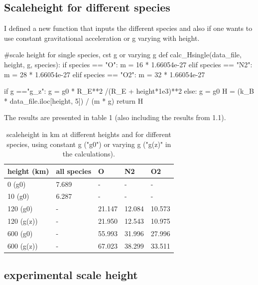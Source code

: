 \documentclass[a4paper, 12pt]{article}
\begin{document}
\subsection{Scaleheight for different species}
I defined a new function that inputs the different species and also if one wants to use constant gravitational acceleration or g varying with height. 


\begin{python}
#scale height for single species, cst g or varying g
def calc_Hsingle(data_file, height, g, species):
    if species == "O":
        m = 16 * 1.66054e-27
    elif species == "N2":
        m = 28 * 1.66054e-27
    elif species == "O2":
        m = 32 * 1.66054e-27
    
    if g =="g_z":
        g = g0 * R_E**2 /(R_E + height*1e3)**2
    else:
        g = g0
    H = (k_B * data_file.iloc[height, 5]) / (m * g)
    return H
\end{python}

The results are presented in table 1 (also including the results from 1.1).
\begin{table}[H]
	\centering
	\caption{scaleheight in km at different heights and for different species, using constant g ("g0") or varying g ("g(z)" in the calculations).}
	\begin{tabular}{lllll}
	height (km) &all species & O & N2 & O2 \\ \hline
	0 (g0) & 7.689 & - & -& - \\ 
	10 (g0)& 6.287& - & - & - \\
	120 (g0) & - & 21.147 &12.084&10.573\\
	120 (g(z)) & - & 21.950 & 12.543&10.975\\
	600 (g0) & - & 55.993&31.996&27.996\\
	600 (g(z))& - & 67.023&38.299&33.511
	\end{tabular}
\end{table}

\subsection{experimental scale height}
\end{document}
